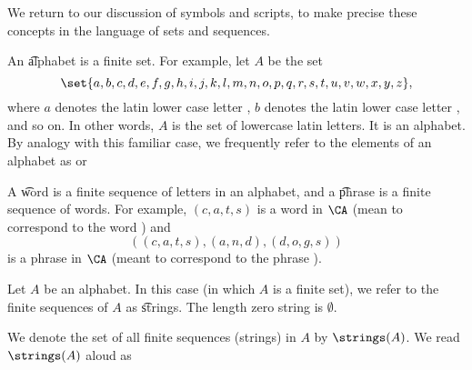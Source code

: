 

We return to our discussion of symbols and scripts, to make precise these concepts in the language of sets and sequences.


An \t{alphabet} is a finite set.
For example, let $A$ be the set
\[
  \set{a, b, c, d, e, f,g,h,i,j,k,l,m,n,o,p,q,r,s,t,u,v,w, x, y,z},
\]
where $a$ denotes the latin lower case letter , $b$ denotes the latin lower case letter , and so on.
In other words, $A$ is the set of lowercase latin letters.
It is an alphabet.
By analogy with this familiar case, we frequently refer to the elements of an alphabet as  or 

A \t{word} is a finite sequence of letters in an alphabet, and a \t{phrase} is a finite sequence of words.
For example, $(c,a,t,s)$ is a word in $\CA$ (mean to correspond to the word ) and
\[
  ((c,a,t,s), (a,n,d), (d,o,g,s))
\]
is a phrase in $\CA$ (meant to correspond to the phrase ).


Let $A$ be an alphabet.
In this case (in which $A$ is a finite set), we refer to the finite sequences of $A$ as \t{strings}.
The length zero string is $\emptyset$.


We denote the set of all finite sequences (strings) in $A$ by $\strings(A)$.
We read $\strings(A)$ aloud as 

\blankpage
